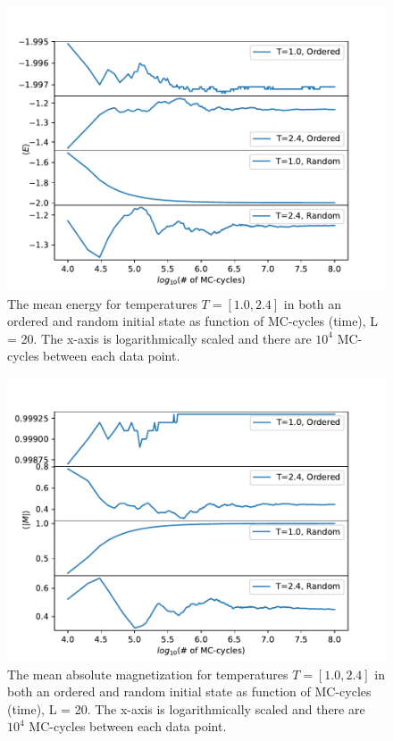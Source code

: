 \documentclass[12pt,english,a4paper]{article}
\begin{document}
\begin{figure}[H]
    \centering
    \includegraphics[scale=0.7]{Code_Files/Figures/Most_Likely_State_E_mean_L_20.pdf}
    \caption{The mean energy for temperatures $T=[1.0,2.4]$ in both an ordered and random initial state as function of MC-cycles (time), L = 20. The x-axis is logarithmically scaled and there are $10^4$ MC-cycles between each data point.}
    \label{fig:E_equiv}
\end{figure}
\begin{figure}[H]
    \centering
    \includegraphics[scale=0.7]{Code_Files/Figures/Most_Likely_State_M_abs_L_20.pdf}
    \caption{The mean absolute magnetization for temperatures $T=[1.0,2.4]$ in both an ordered and random initial state as function of MC-cycles (time), L = 20. The x-axis is logarithmically scaled and there are $10^4$ MC-cycles between each data point.}
    \label{fig:M_equiv}
\end{figure}
\end{document}
